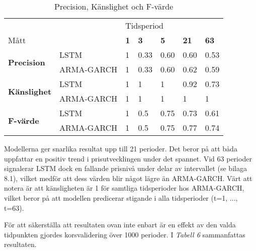 \documentclass[11pt]{article}
\begin{document}
\begin{table}[H]
\caption{Precision, Känslighet och F-värde}
\begin{tabular}{||lllllll||}
\hline
                                     &            & \multicolumn{5}{l||}{Tidsperiod}                                  \\
Mått                                 &            & \textbf{1} & \textbf{3} & \textbf{5} & \textbf{21} & \textbf{63} \\ \hline\hline
\multirow{2}{*}{\textbf{Precision}} & LSTM       & 1          & 0.33       & 0.60       & 0.60        & 0.53        \\
                                     & ARMA-GARCH & 1          & 0.33       & 0.60       & 0.62        & 0.59        \\ \cline{2-7} 
\multirow{2}{*}{\textbf{Känslighet}}  & LSTM       & 1          & 1          & 1          & 0.92           & 0.73       \\
                                     & ARMA-GARCH & 1          & 1          & 1          & 1           & 1           \\ \cline{2-7} 
\multirow{2}{*}{\textbf{F-värde}}    & LSTM       & 1          & 0.5        & 0.75       & 0.73       & 0.61       \\
                                     & ARMA-GARCH & 1          & 0.5        & 0.75       & 0.77       & 0.74        \\ \hline
\end{tabular}
\end{table}

Modellerna ger snarlika resultat upp till 21 perioder. Det beror på att båda uppfattar en positiv trend i prisutvecklingen under det spannet. Vid 63 perioder signalerar LSTM dock en fallande prisnivå under delar av intervallet (se bilaga 8.1), vilket medför att dess värden blir något lägre än ARMA-GARCH. Värt att notera är att känsligheten är 1 för samtliga tidsperioder hos ARMA-GARCH, vilket beror på att modellen predicerar stigande i alla tidsperioder (t=1, ..., t=63).

För att säkerställa att resultaten ovan inte enbart är en effekt av den valda tidpunkten gjordes korsvalidering över 1000 perioder. I \emph{Tabell 6} sammanfattas resultaten.
\end{document}
